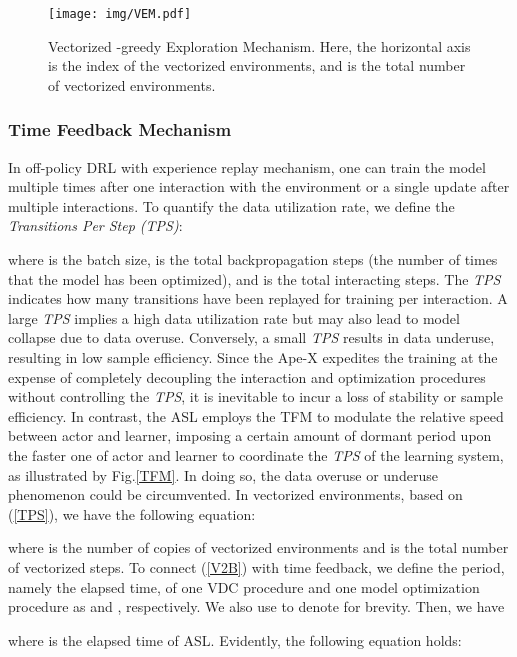 \documentclass[journal]{IEEEtran}
\begin{document}
\begin{figure}[t]
	\centering
	\texttt{[image: img/VEM.pdf]}
	\caption{Vectorized -greedy Exploration Mechanism. Here, the horizontal axis is the index of the vectorized environments, and  is the total number of vectorized environments.}
	\label{VEM}
\end{figure}

\subsubsection{Time Feedback Mechanism}

In off-policy DRL with experience replay mechanism, one can train the model multiple times after one interaction with the environment or a single update after multiple interactions. To quantify the data utilization rate, we define the \textit{Transitions Per Step (TPS)}:



\noindent where  is the batch size,  is the total backpropagation steps (the number of times that the model has been optimized), and  is the total interacting steps. The \textit{TPS} indicates how many transitions have been replayed for training per interaction. A large \textit{TPS} implies a high data utilization rate but may also lead to model collapse due to data overuse\cite{overuse}. Conversely, a small \textit{TPS} results in data underuse, resulting in low sample efficiency. Since the Ape-X expedites the training at the expense of completely decoupling the interaction and optimization procedures without controlling the \textit{TPS}, it is inevitable to incur a loss of stability or sample efficiency. In contrast, the ASL employs the TFM to modulate the relative speed between actor and learner, imposing a certain amount of dormant period upon the faster one of actor and learner to coordinate the \textit{TPS} of the learning system, as illustrated by Fig.\ref{TFM}. In doing so, the data overuse or underuse phenomenon could be circumvented. In vectorized environments, based on (\ref{TPS}), we have the following equation:


\noindent where  is the number of copies of vectorized environments and  is the total number of vectorized steps. To connect (\ref{V2B}) with time feedback, we define the period, namely the elapsed time, of one VDC procedure and one model optimization procedure as  and , respectively. We also use  to denote  for brevity. Then, we have

\noindent where  is the elapsed time of ASL. Evidently, the following equation holds:
\end{document}
